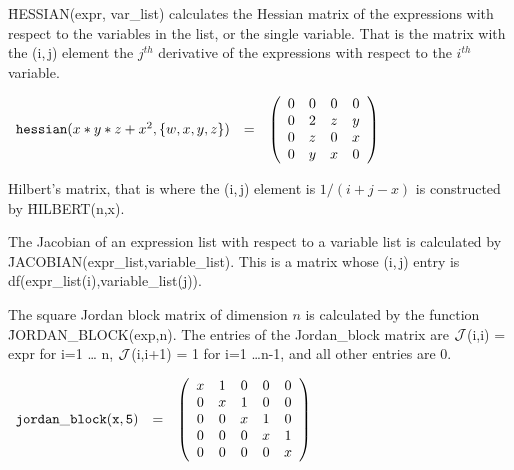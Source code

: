 \f{HESSIAN}(expr, var\_list) calculates the Hessian
matrix of the expressions with respect to the variables in the list,
or the single variable.  That is the matrix with the (i,$\,$j) element
the $j^{th}$ derivative of the expressions with respect to the
$i^{th}$ variable.

\begin{flushleft}  
\hspace*{0.1in}
\begin{math}        
\begin{array}{ccc}
{\tt hessian}(x*y*z+x^2,\{w,x,y,z\}) & = & 
\left( \begin{array}{cccc} 0 & 0 & 0 & 0 \\ 0 & 2 & z & y \\ 0 & z & 0 
& x \\ 0 & y & x & 0
\end{array} \right)
\end{array}
\end{math}  
\end{flushleft}

Hilbert's matrix, that is where the (i,$\,$j) element is $1/(i+j-x)$
is constructed by \f{HILBERT}(n,x).

The Jacobian of an expression list with respect to a variable list is
calculated by
\f{JACOBIAN}(expr\_list,variable\_list).  This is a
matrix whose (i,$\,$j) entry is df(expr\_list(i),variable\_list(j)).


The square Jordan block matrix of dimension $n$ is calculated by the
function \f{JORDAN\_BLOCK}(exp,n).  The entries
of the Jordan\_block matrix are ${\cal J}$(i,i) = expr for i=1 \ldots
n, ${\cal J}$(i,i+1) = 1 for i=1 \ldots n-1, and all other entries are 0.

\begin{flushleft}  
\hspace*{0.1in}
\begin{math}        
\begin{array}{ccc}
{\tt jordan\_block(x,5)} & = & 
\left( \begin{array}{ccccc} x & 1 & 0 & 0 & 0 \\ 0 & x & 1 & 0 & 0 \\ 0 
& 0 & x & 1 & 0 \\ 0 & 0 & 0 & x & 1 \\ 0 & 0 & 0 & 0 & x
\end{array} \right)
\end{array}
\end{math}  
\end{flushleft}

